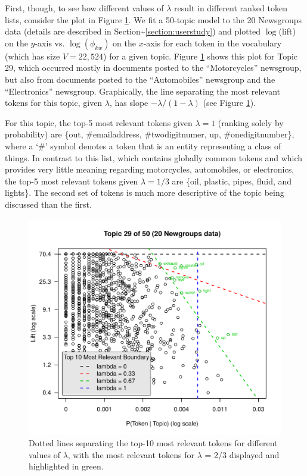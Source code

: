 \documentclass[12pt,]{isuthesis}
\begin{document}
First, though, to see how different values of \(\lambda\) result in
different ranked token lists, consider the plot in Figure
\ref{fig:relevance}. We fit a 50-topic model to the 20 Newsgroups data
(details are described in
Section\textasciitilde{}\ref{section:userstudy}) and plotted
\(\log\)(lift) on the \(y\)-axis vs. \(\log(\phi_{kw})\) on the
\(x\)-axis for each token in the vocabulary (which has size
\(V=22,524\)) for a given topic. Figure \ref{fig:relevance} shows this
plot for Topic 29, which occurred mostly in documents posted to the
``Motorcycles'' newsgroup, but also from documents posted to the
``Automobiles'' newsgroup and the ``Electronics'' newsgroup.
Graphically, the line separating the most relevant tokens for this
topic, given \(\lambda\), has slope \(-\lambda/(1 - \lambda)\) (see
Figure \ref{fig:relevance}).

For this topic, the top-5 most relevant tokens given \(\lambda = 1\)
(ranking solely by probability) are \{out, \#emailaddress,
\#twodigitnumer, up, \#onedigitnumber\}, where a `\#' symbol denotes a
token that is an entity representing a class of things. In contrast to
this list, which contains globally common tokens and which provides very
little meaning regarding motorcycles, automobiles, or electronics, the
top-5 most relevant tokens given \(\lambda = 1/3\) are \{oil, plastic,
pipes, fluid, and lights\}. The second set of tokens is much more
descriptive of the topic being discussed than the first.

\begin{figure}[htbp]
\centering
\includegraphics{images/fig_topic29.pdf}
\caption{\label{fig:relevance}Dotted lines separating the top-10 most
relevant tokens for different values of \(\lambda\), with the most
relevant tokens for \(\lambda\) = 2/3 displayed and highlighted in
green.}
\end{figure}
\end{document}
